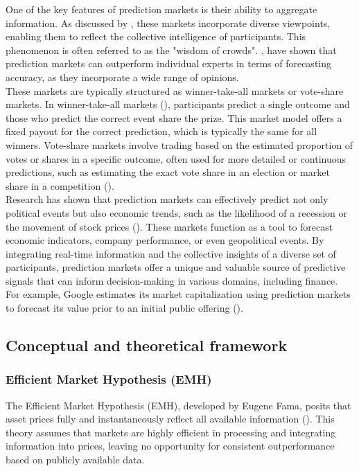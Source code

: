 \documentclass[12pt]{report}
\begin{document}
One of the key features of prediction markets is their ability to aggregate information. As discussed by \cite{bossaerts_price_2022}, these markets incorporate diverse viewpoints, enabling them to reflect the collective intelligence of participants. This phenomenon is often referred to as the "wisdom of crowds". \cite{berg_prediction_2008}, have shown that prediction markets can outperform individual experts in terms of forecasting accuracy, as they incorporate a wide range of opinions. \\

These markets are typically structured as winner-take-all markets or vote-share markets. In winner-take-all markets (\cite{dai_wisdom_2021}), participants predict a single outcome and those who predict the correct event share the prize. This market model offers a fixed payout for the correct prediction, which is typically the same for all winners. Vote-share markets involve trading based on the estimated proportion of votes or shares in a specific outcome, often used for more detailed or continuous predictions, such as estimating the exact vote share in an election or market share in a competition (\cite{dai_wisdom_2021}).\\

Research has shown that prediction markets can effectively predict not only political events but also economic trends, such as the likelihood of a recession or the movement of stock prices (\cite{wolfers_prediction_2004}). These markets function as a tool to forecast economic indicators, company performance, or even geopolitical events. By integrating real-time information and the collective insights of a diverse set of participants, prediction markets offer a unique and valuable source of predictive signals that can inform decision-making in various domains, including finance. For example, Google estimates its market capitalization using prediction markets to forecast its value prior to an initial public offering (\cite{berg_searching_2009}).


\subsection{Conceptual and theoretical framework}

\subsubsection{Efficient Market Hypothesis (EMH)}

The Efficient Market Hypothesis (EMH), developed by Eugene Fama, posits that asset prices fully and instantaneously reflect all available information (\cite{naseer_efficient_2016}). This theory assumes that markets are highly efficient in processing and integrating information into prices, leaving no opportunity for consistent outperformance based on publicly available data.\\
\end{document}
